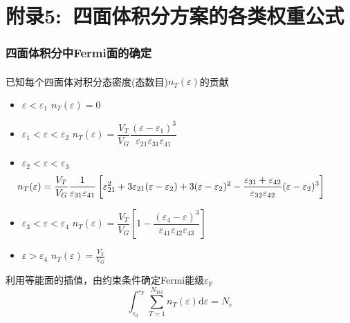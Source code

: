 \documentclass[cjk,slidestop,compress,mathserif,blue]{beamer}
\newcommand{\upcite}[1]{\hspace{0ex}\textsuperscript{\cite{#1}}} %
\begin{document}
\section{附录5:~四面体积分方案的各类权重公式}
\frame
{
	\frametitle{四面体积分中\textrm{Fermi}面的确定}
	已知每个四面体对积分态密度(态数目)$n_T(\varepsilon)$的贡献\upcite{PRB49-16233_1994}
	\begin{itemize}
	\item $\varepsilon<\varepsilon_1$
		\:	$n_T(\varepsilon)=0$
	\item $\varepsilon_1<\varepsilon<\varepsilon_2$
		\:	$n_T(\varepsilon)=\dfrac{V_T}{V_G}\dfrac{(\varepsilon-\varepsilon_1)^3}{\varepsilon_{21}\varepsilon_{31}\varepsilon_{41}}$
	\item $\varepsilon_2<\varepsilon<\varepsilon_3$
		\begin{displaymath}
			\hspace*{-35pt}	n_T(\varepsilon)=\dfrac{V_T}{V_G}\dfrac1{\varepsilon_{31}\varepsilon_{41}}\left[\varepsilon_{21}^2+3\varepsilon_{21}(\varepsilon-\varepsilon_2)+3(\varepsilon-\varepsilon_2)^2-\dfrac{\varepsilon_{31}+\varepsilon_{42}}{\varepsilon_{32}\varepsilon_{42}}(\varepsilon-\varepsilon_2)^3\right]
		\end{displaymath}
	\item $\varepsilon_3<\varepsilon<\varepsilon_4$
		\:	$n_T(\varepsilon)=\dfrac{V_T}{V_G}\left[1-\dfrac{(\varepsilon_4-\varepsilon)^3}{\varepsilon_{41}\varepsilon_{42}\varepsilon_{43}}\right]$
	\item $\varepsilon>\varepsilon_4$
		\:	$n_T(\varepsilon)=\frac{V_T}{V_G}$
	\end{itemize}
	利用等能面的插值，由约束条件确定\textrm{Fermi}能级$\varepsilon_{\mathrm F}$
	$$\int_{\varepsilon_0}^{\varepsilon_{\mathrm F}}\sum_{T=1}^{N_{Tet}}n_T(\varepsilon)\mathrm{d}\varepsilon=N_e$$
}
\end{document}
